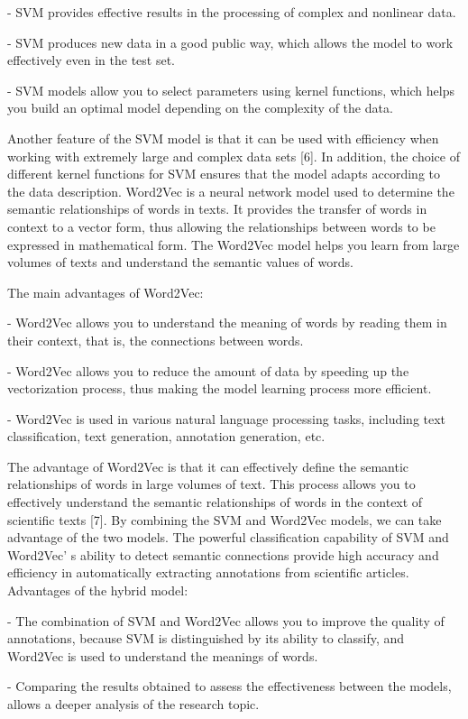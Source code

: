 - SVM provides effective results in the processing of complex and
nonlinear data.

- SVM produces new data in a good public way, which allows the model to
work effectively even in the test set.

- SVM models allow you to select parameters using kernel functions,
which helps you build an optimal model depending on the complexity of
the data.

Another feature of the SVM model is that it can be used with efficiency
when working with extremely large and complex data sets {[}6{]}. In
addition, the choice of different kernel functions for SVM ensures that
the model adapts according to the data description. Word2Vec is a neural
network model used to determine the semantic relationships of words in
texts. It provides the transfer of words in context to a vector form,
thus allowing the relationships between words to be expressed in
mathematical form. The Word2Vec model helps you learn from large volumes
of texts and understand the semantic values of words.

The main advantages of Word2Vec:

- Word2Vec allows you to understand the meaning of words by reading them
in their context, that is, the connections between words.

- Word2Vec allows you to reduce the amount of data by speeding up the
vectorization process, thus making the model learning process more
efficient.

- Word2Vec is used in various natural language processing tasks,
including text classification, text generation, annotation generation,
etc.

The advantage of Word2Vec is that it can effectively define the semantic
relationships of words in large volumes of text. This process allows you
to effectively understand the semantic relationships of words in the
context of scientific texts {[}7{]}. By combining the SVM and Word2Vec
models, we can take advantage of the two models. The powerful
classification capability of SVM and Word2Vec' s ability
to detect semantic connections provide high accuracy and efficiency in
automatically extracting annotations from scientific articles.
Advantages of the hybrid model:

- The combination of SVM and Word2Vec allows you to improve the quality
of annotations, because SVM is distinguished by its ability to classify,
and Word2Vec is used to understand the meanings of words.

- Comparing the results obtained to assess the effectiveness between the
models, allows a deeper analysis of the research topic.


